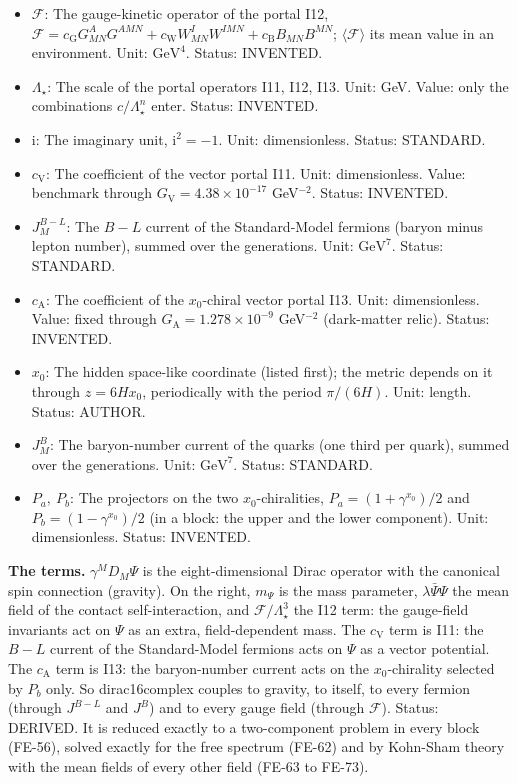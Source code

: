 \documentclass[
  10pt,
]{article}
\begin{document}
\begin{itemize}
  \(\Delta N_{\mathrm{eff}} \le 0.001\)). Status: RECORD.
\item
  \(\mathcal{F}\): The gauge-kinetic operator of the portal I12,
  \(\mathcal{F} = c_{\mathrm{G}}G^A_{MN}G^{AMN} + c_{\mathrm{W}}W^I_{MN}W^{IMN} + c_{\mathrm{B}}B_{MN}B^{MN}\);
  \(\langle\mathcal{F}\rangle\) its mean value in an environment. Unit:
  \(\mathrm{GeV}^{4}\). Status: INVENTED.
\item
  \(\Lambda_\star\): The scale of the portal operators I11, I12, I13.
  Unit: GeV. Value: only the combinations \(c/\Lambda_\star^n\) enter.
  Status: INVENTED.
\item
  \(\mathrm{i}\): The imaginary unit, \(\mathrm{i}^2 = -1\). Unit:
  dimensionless. Status: STANDARD.
\item
  \(c_{\mathrm{V}}\): The coefficient of the vector portal I11. Unit:
  dimensionless. Value: benchmark through
  \(G_{\mathrm{V}} = 4.38\times10^{-17}\) GeV\(^{-2}\). Status:
  INVENTED.
\item
  \(J^{B-L}_M\): The \(B - L\) current of the Standard-Model fermions
  (baryon minus lepton number), summed over the generations. Unit:
  \(\mathrm{GeV}^{7}\). Status: STANDARD.
\item
  \(c_{\mathrm{A}}\): The coefficient of the \(x_0\)-chiral vector
  portal I13. Unit: dimensionless. Value: fixed through
  \(G_{\mathrm{A}} = 1.278\times10^{-9}\) GeV\(^{-2}\) (dark-matter
  relic). Status: INVENTED.
\item
  \(x_0\): The hidden space-like coordinate (listed first); the metric
  depends on it through \(z = 6Hx_0\), periodically with the period
  \(\pi/(6H)\). Unit: length. Status: AUTHOR.
\item
  \(J^{B}_M\): The baryon-number current of the quarks (one third per
  quark), summed over the generations. Unit: \(\mathrm{GeV}^{7}\).
  Status: STANDARD.
\item
  \(P_a,\ P_b\): The projectors on the two \(x_0\)-chiralities,
  \(P_a = (1 + \gamma^{x_0})/2\) and \(P_b = (1 - \gamma^{x_0})/2\) (in
  a block: the upper and the lower component). Unit: dimensionless.
  Status: INVENTED.
\end{itemize}

\textbf{The terms.} \(\gamma^MD_M\Psi\) is the eight-dimensional Dirac
operator with the canonical spin connection (gravity). On the right,
\(m_\Psi\) is the mass parameter, \(\lambda\bar\Psi\Psi\) the mean field
of the contact self-interaction, and \(\mathcal{F}/\Lambda_\star^3\) the
I12 term: the gauge-field invariants act on \(\Psi\) as an extra,
field-dependent mass. The \(c_{\mathrm{V}}\) term is I11: the \(B - L\)
current of the Standard-Model fermions acts on \(\Psi\) as a vector
potential. The \(c_{\mathrm{A}}\) term is I13: the baryon-number current
acts on the \(x_0\)-chirality selected by \(P_b\) only. So
dirac16complex couples to gravity, to itself, to every fermion (through
\(J^{B-L}\) and \(J^B\)) and to every gauge field (through
\(\mathcal{F}\)). Status: DERIVED. It is reduced exactly to a
two-component problem in every block (FE-56), solved exactly for the
free spectrum (FE-62) and by Kohn-Sham theory with the mean fields of
every other field (FE-63 to FE-73).
\end{document}
